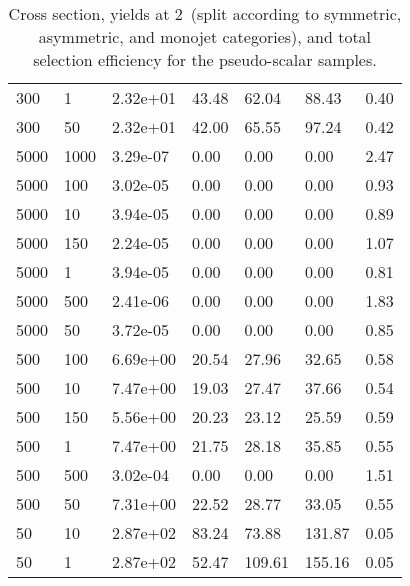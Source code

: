 \begin{table}
\begin{tabular}{lllllll}
300       &   1         &   2.32e+01  &   43.48     &   62.04     &   88.43     &   0.40      \\ 
300       &   50        &   2.32e+01  &   42.00     &   65.55     &   97.24     &   0.42      \\ 
5000      &   1000      &   3.29e-07  &   0.00      &   0.00      &   0.00      &   2.47      \\ 
5000      &   100       &   3.02e-05  &   0.00      &   0.00      &   0.00      &   0.93      \\ 
5000      &   10        &   3.94e-05  &   0.00      &   0.00      &   0.00      &   0.89      \\ 
5000      &   150       &   2.24e-05  &   0.00      &   0.00      &   0.00      &   1.07      \\ 
5000      &   1         &   3.94e-05  &   0.00      &   0.00      &   0.00      &   0.81      \\ 
5000      &   500       &   2.41e-06  &   0.00      &   0.00      &   0.00      &   1.83      \\ 
5000      &   50        &   3.72e-05  &   0.00      &   0.00      &   0.00      &   0.85      \\ 
500       &   100       &   6.69e+00  &   20.54     &   27.96     &   32.65     &   0.58      \\ 
500       &   10        &   7.47e+00  &   19.03     &   27.47     &   37.66     &   0.54      \\ 
500       &   150       &   5.56e+00  &   20.23     &   23.12     &   25.59     &   0.59      \\ 
500       &   1         &   7.47e+00  &   21.75     &   28.18     &   35.85     &   0.55      \\ 
500       &   500       &   3.02e-04  &   0.00      &   0.00      &   0.00      &   1.51      \\ 
500       &   50        &   7.31e+00  &   22.52     &   28.77     &   33.05     &   0.55      \\ 
50        &   10        &   2.87e+02  &   83.24     &   73.88     &   131.87    &   0.05      \\ 
50        &   1         &   2.87e+02  &   52.47     &   109.61    &   155.16    &   0.05      \\ 
\hline
\end{tabular}
\caption{Cross section, yields at 2~\ifb (split according to symmetric, asymmetric, and monojet categories), and total selection efficiency for the pseudo-scalar \DMtt samples.}
\label{summaryTableAN_DMS_xs10_g1p0_2p1fb_exp}
\end{table}
